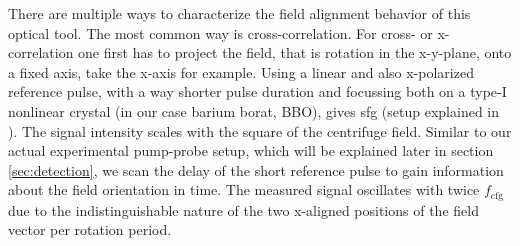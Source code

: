 There are multiple ways to characterize the field alignment behavior of this optical tool. The most common way is cross-correlation. For cross- or x-correlation one first has to project the field, that is rotation in the x-y-plane, onto a fixed axis, take the x-axis for example. Using a linear and also x-polarized reference pulse, with a way shorter pulse duration and focussing both on a type-I nonlinear crystal (in our case barium borat, BBO), gives \gls{sfg} (setup explained in \cite{wangUltraslowOpticalCentrifuge2026}). The signal intensity scales with the square of the centrifuge field.
Similar to our actual experimental pump-probe setup, which will be explained later in section \ref{sec:detection}, we scan the delay of the short reference pulse to gain information about the field orientation in time. The measured signal oscillates with twice $f_{\mathrm{cfg}}$ due to the indistinguishable nature of the two x-aligned positions of the field vector per rotation period.

